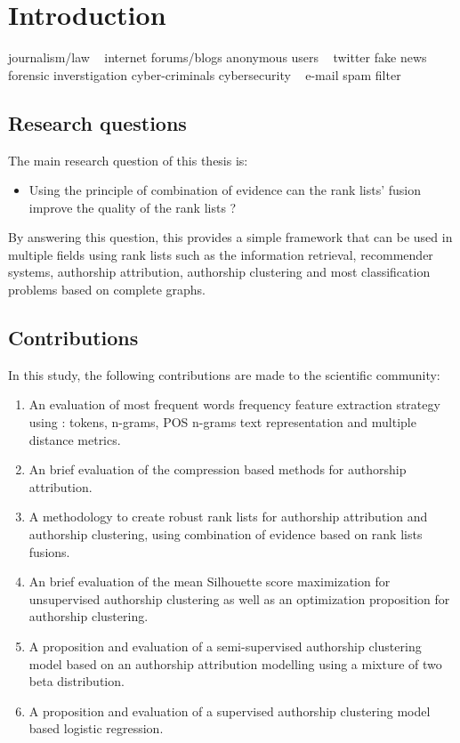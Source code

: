 
\section{Introduction \label{sec:introduction}}

journalism/law ~\cite{pan16_clustering_site}
internet forums/blogs anonymous users ~\cite{kocher_pan16}
twitter fake news ~\cite{unine_pan20_fake}
forensic inverstigation cyber-criminals
cybersecurity ~\cite{automated_unsupervised}
e-mail spam filter ~\cite{savoy_probability}

\subsection{Research questions}

The main research question of this thesis is:

\begin{itemize}
  \item Using the principle of combination of evidence can the rank lists' fusion improve the quality of the rank lists ?
\end{itemize}

By answering this question, this provides a simple framework that can be used in multiple fields using rank lists such as the information retrieval, recommender systems, authorship attribution, authorship clustering and most classification problems based on complete graphs.

\subsection{Contributions}

In this study, the following contributions are made to the scientific community:

\begin{enumerate}
  \item An evaluation of most frequent words frequency feature extraction strategy using : tokens, n-grams, POS n-grams text representation and multiple distance metrics.
  \item An brief evaluation of the compression based methods for authorship attribution.
  \item A methodology to create robust rank lists for authorship attribution and authorship clustering, using combination of evidence based on rank lists fusions.
  \item An brief evaluation of the mean Silhouette score maximization for unsupervised authorship clustering as well as an optimization proposition for authorship clustering.
  \item A proposition and evaluation of a semi-supervised authorship clustering model based on an authorship attribution modelling using a mixture of two beta distribution.
  \item A proposition and evaluation of a supervised authorship clustering model based logistic regression.
\end{enumerate}

